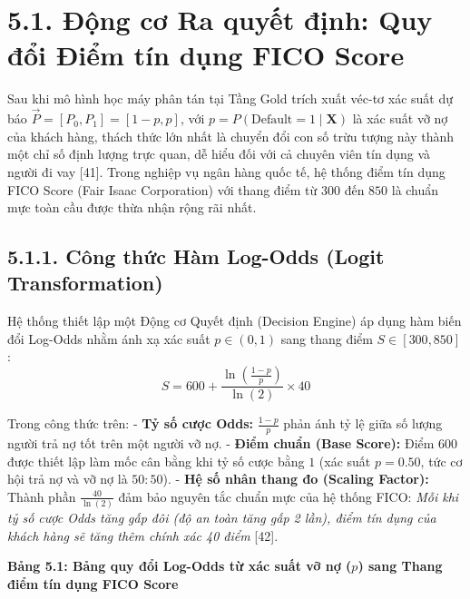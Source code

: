 \documentclass[
  13pt,
  a4paper,
]{report}
\begin{document}
\section{5.1. Động cơ Ra quyết định: Quy đổi Điểm tín dụng FICO
Score}\label{ux111ux1ed9ng-cux1a1-ra-quyux1ebft-ux111ux1ecbnh-quy-ux111ux1ed5i-ux111iux1ec3m-tuxedn-dux1ee5ng-fico-score}

Sau khi mô hình học máy phân tán tại Tầng Gold trích xuất véc-tơ xác
suất dự báo \(\vec{P} = [P_0, P_1] = [1 - p, p]\), với
\(p = P(\text{Default} = 1 \mid \mathbf{X})\) là xác suất vỡ nợ của
khách hàng, thách thức lớn nhất là chuyển đổi con số trừu tượng này
thành một chỉ số định lượng trực quan, dễ hiểu đối với cả chuyên viên
tín dụng và người đi vay {[}41{]}. Trong nghiệp vụ ngân hàng quốc tế, hệ
thống điểm tín dụng FICO Score (Fair Isaac Corporation) với thang điểm
từ \(300\) đến \(850\) là chuẩn mực toàn cầu được thừa nhận rộng rãi
nhất.

\subsection{5.1.1. Công thức Hàm Log-Odds (Logit
Transformation)}\label{cuxf4ng-thux1ee9c-huxe0m-log-odds-logit-transformation}

Hệ thống thiết lập một Động cơ Quyết định (Decision Engine) áp dụng hàm
biến đổi Log-Odds nhằm ánh xạ xác suất \(p \in (0, 1)\) sang thang điểm
\(S \in [300, 850]\):
\[S = 600 + \frac{\ln\left(\frac{1 - p}{p}\right)}{\ln(2)} \times 40\]

Trong công thức trên: - \textbf{Tỷ số cược Odds:} \(\frac{1 - p}{p}\)
phản ánh tỷ lệ giữa số lượng người trả nợ tốt trên một người vỡ nợ. -
\textbf{Điểm chuẩn (Base Score):} Điểm \(600\) được thiết lập làm mốc
cân bằng khi tỷ số cược bằng \(1\) (xác suất \(p = 0.50\), tức cơ hội
trả nợ và vỡ nợ là \(50:50\)). - \textbf{Hệ số nhân thang đo (Scaling
Factor):} Thành phần \(\frac{40}{\ln(2)}\) đảm bảo nguyên tắc chuẩn mực
của hệ thống FICO: \emph{Mỗi khi tỷ số cược Odds tăng gấp đôi (độ an
toàn tăng gấp 2 lần), điểm tín dụng của khách hàng sẽ tăng thêm chính
xác 40 điểm} {[}42{]}.

\textbf{Bảng 5.1: Bảng quy đổi Log-Odds từ xác suất vỡ nợ (\(p\)) sang
Thang điểm tín dụng FICO Score}
\end{document}
